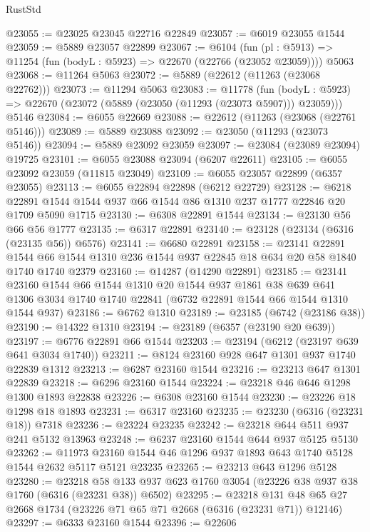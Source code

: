 \begin{lexlean}{RustStd}
\begin{coremodule}
@23055 := @23025 @23045 @22716 @22849
@23057 := @6019 @23055 @1544
@23059 := @5889 @23057 @22899
@23067 := @6104
    (fun (pl : @5913) => @11254 (fun (bodyL : @5923) => @22670 (@22766 (@23052 @23059))))
    @5063
@23068 := @11264 @5063
@23072 := @5889 (@22612 (@11263 (@23068 @22762)))
@23073 := @11294 @5063
@23083 := @11778
    (fun (bodyL : @5923) => @22670 (@23072 (@5889 (@23050 (@11293 (@23073 @5907))) @23059)))
    @5146
@23084 := @6055 @22669
@23088 := @22612 (@11263 (@23068 (@22761 @5146)))
@23089 := @5889 @23088
@23092 := @23050 (@11293 (@23073 @5146))
@23094 := @5889 @23092 @23059
@23097 := @23084 (@23089 @23094) @19725
@23101 := @6055 @23088 @23094 (@6207 @22611)
@23105 := @6055 @23092 @23059 (@11815 @23049)
@23109 := @6055 @23057 @22899 (@6357 @23055)
@23113 := @6055 @22894 @22898 (@6212 @22729)
@23128 := @6218 @22891 @1544 @1544 @937 @66 @1544 @86 @1310 @237 @1777 @22846 @20 @1709 @5090 @1715
@23130 := @6308 @22891 @1544
@23134 := @23130 @56 @66 @56 @1777
@23135 := @6317 @22891
@23140 := @23128 (@23134 (@6316 (@23135 @56)) @6576)
@23141 := @6680 @22891
@23158 := @23141
    @22891
    @1544
    @66
    @1544
    @1310
    @236
    @1544
    @937
    @22845
    @18
    @634
    @20
    @58
    @1840
    @1740
    @1740
    @2379
@23160 := @14287 (@14290 @22891)
@23185 := @23141
    @23160
    @1544
    @66
    @1544
    @1310
    @20
    @1544
    @937
    @1861
    @38
    @639
    @641
    @1306
    @3034
    @1740
    @1740
    @22841
    (@6732 @22891 @1544 @66 @1544 @1310 @1544 @937)
@23186 := @6762 @1310
@23189 := @23185 (@6742 (@23186 @38))
@23190 := @14322 @1310
@23194 := @23189 (@6357 (@23190 @20 @639))
@23197 := @6776 @22891 @66 @1544
@23203 := @23194 (@6212 (@23197 @639 @641 @3034 @1740))
@23211 := @8124 @23160 @928 @647 @1301 @937 @1740 @22839 @1312
@23213 := @6287 @23160 @1544
@23216 := @23213 @647 @1301 @22839
@23218 := @6296 @23160 @1544
@23224 := @23218 @46 @646 @1298 @1300 @1893 @22838
@23226 := @6308 @23160 @1544
@23230 := @23226 @18 @1298 @18 @1893
@23231 := @6317 @23160
@23235 := @23230 (@6316 (@23231 @18)) @7318
@23236 := @23224 @23235
@23242 := @23218 @644 @511 @937 @241 @5132 @13963
@23248 := @6237 @23160 @1544 @644 @937 @5125 @5130
@23262 := @11973 @23160 @1544 @46 @1296 @937 @1893 @643 @1740 @5128 @1544 @2632 @5117 @5121 @23235
@23265 := @23213 @643 @1296 @5128
@23280 := @23218
    @58
    @133
    @937
    @623
    @1760
    @3054
    (@23226 @38 @937 @38 @1760 (@6316 (@23231 @38)) @6502)
@23295 := @23218 @131 @48 @65 @27 @2668 @1734 (@23226 @71 @65 @71 @2668 (@6316 (@23231 @71)) @12146)
@23297 := @6333 @23160 @1544
@23396 := @22606

\end{coremodule}
\end{lexlean}

